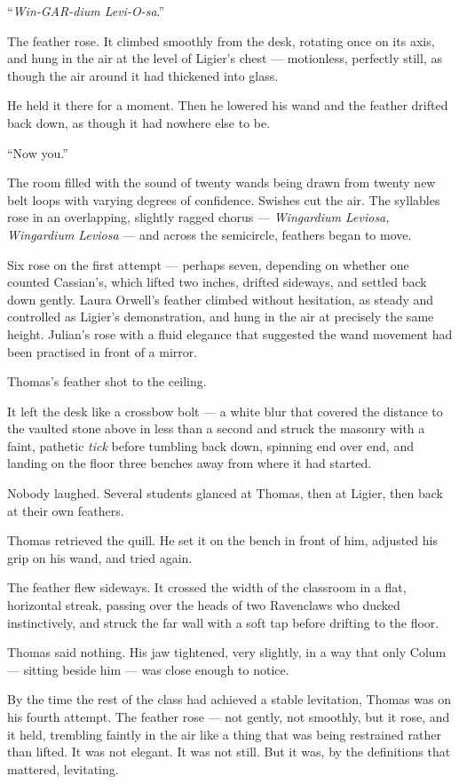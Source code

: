 \enquote{\textit{Win-GAR-dium Levi-O-sa}.}
 
The feather rose. It climbed smoothly from the desk, rotating once on its axis, and hung in the air at the level of Ligier's chest --- motionless, perfectly still, as though the air around it had thickened into glass.
 
He held it there for a moment. Then he lowered his wand and the feather drifted back down, as though it had nowhere else to be.
 
\enquote{Now you.}
 
The room filled with the sound of twenty wands being drawn from twenty new belt loops with varying degrees of confidence. Swishes cut the air. The syllables rose in an overlapping, slightly ragged chorus --- \textit{Wingardium Leviosa, Wingardium Leviosa} --- and across the semicircle, feathers began to move.
 
Six rose on the first attempt --- perhaps seven, depending on whether one counted Cassian's, which lifted two inches, drifted sideways, and settled back down gently. Laura Orwell's feather climbed without hesitation, as steady and controlled as Ligier's demonstration, and hung in the air at precisely the same height. Julian's rose with a fluid elegance that suggested the wand movement had been practised in front of a mirror.
 
Thomas's feather shot to the ceiling.
 
It left the desk like a crossbow bolt --- a white blur that covered the distance to the vaulted stone above in less than a second and struck the masonry with a faint, pathetic \textit{tick} before tumbling back down, spinning end over end, and landing on the floor three benches away from where it had started.
 
Nobody laughed. Several students glanced at Thomas, then at Ligier, then back at their own feathers.
 
Thomas retrieved the quill. He set it on the bench in front of him, adjusted his grip on his wand, and tried again.
 
The feather flew sideways. It crossed the width of the classroom in a flat, horizontal streak, passing over the heads of two Ravenclaws who ducked instinctively, and struck the far wall with a soft tap before drifting to the floor.
 
Thomas said nothing. His jaw tightened, very slightly, in a way that only Colum --- sitting beside him --- was close enough to notice.
 
By the time the rest of the class had achieved a stable levitation, Thomas was on his fourth attempt. The feather rose --- not gently, not smoothly, but it rose, and it held, trembling faintly in the air like a thing that was being restrained rather than lifted. It was not elegant. It was not still. But it was, by the definitions that mattered, levitating.
 
